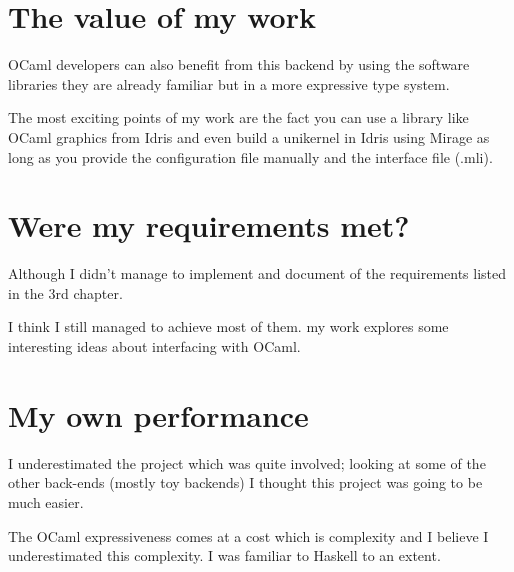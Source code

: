 \section{The value of my work}
OCaml developers can also benefit from this backend by using the 
software libraries they are already familiar but in a more expressive 
type system.

The most exciting points of my work are the fact you can use a library like
OCaml graphics from Idris and even build a unikernel in Idris using Mirage as long as you provide the configuration file manually and the interface file (.mli).


\section{Were my requirements met?}

Although I didn't manage to implement and document of the requirements
listed in the 3rd chapter.

I think I still managed to achieve most of them. my work explores some interesting ideas about interfacing with
OCaml. 

\section{My own performance}
I underestimated the project
which was quite involved; looking at some of the other back-ends (mostly
toy backends)
I thought this project was going to be much easier.

The OCaml expressiveness comes at a cost which is complexity and
I believe I underestimated this complexity. 
I was familiar to Haskell to an extent. 










